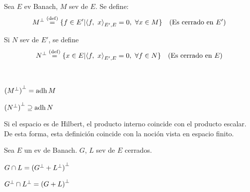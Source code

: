 
\renewcommand{\catnum}{8 (6 No Presencial)}%
\renewcommand{\fecha}{13 de abril de 2020}


\begin{defn} 
Sea $E$ ev Banach, $M$ sev de $E$. Se define:
$$M\ort \defeq \{ f \in E' | \prodint[E', E]{f}{x} = 0, \ \forall x \in M \} \quad \text{(Es cerrado en $E'$)}$$


Si $N$ sev de $E'$, se define
$$N\ort \defeq \{ x \in E | \prodint[E', E]{f}{x} = 0, \ \forall f \in N \} \quad \text{(Es cerrado en $E$)}$$
\end{defn}

\begin{prop} \\
\begin{ienumerate}
    \item ${(M\ort)}\ort = \adh M$
    \item ${(N\ort)}\ort \supseteq \adh N$
\end{ienumerate}
\end{prop}

Si el espacio es de Hilbert, el producto interno coincide con el producto escalar. De esta forma, esta definición coincide con la noción vista en espacio finito.

\begin{prop}
Sea $E$ un ev de Banach. $G$, $L$ sev de $E$ cerrados.
\begin{ienumerate}
    \item $G \cap L = {(G\ort + L\ort)}\ort$
    \item $G\ort \cap L\ort = {(G + L)}\ort$
\end{ienumerate}

\end{prop}


